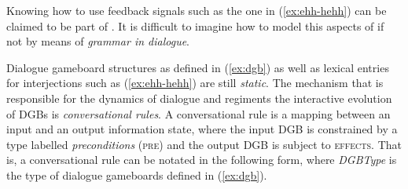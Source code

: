 \documentclass[output=paper
 	        ,biblatex
                ,babelshorthands
                ,newtxmath
                ,draftmode
                ,colorlinks, citecolor=brown
]{langscibook}
\begin{document}
Knowing how  to use feedback signals   such as the one in (\ref{ex:ehh-hehh}) can be claimed to be part of .
%
It is difficult to imagine how to model this aspects of  if not by means of \emph{grammar in dialogue}.


Dialogue gameboard structures as defined in (\ref{ex:dgb}) as well as lexical entries for interjections such as (\ref{ex:ehh-hehh}) are still \emph{static}.
%
The mechanism that is responsible for the dynamics of dialogue and regiments the interactive evolution of DGBs is \emph{conversational rules}.
%
A conversational rule is a mapping between an input and an output information state, where the input DGB is constrained by a type labelled \emph{preconditions} (\textsc{pre})  and the output DGB is subject to \textsc{effects}.
%
That is, a conversational rule can be notated in the following form, where \emph{DGBType} is the type of dialogue gameboards defined in (\ref{ex:dgb}).
%
\ea \label{ex:pre-effect}
\z
\end{document}
